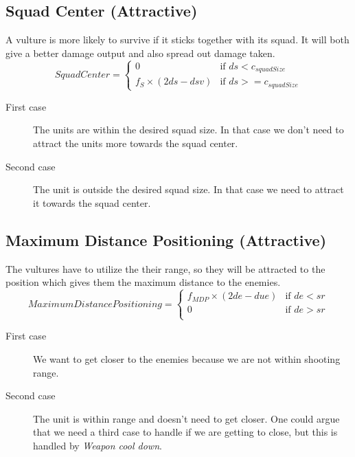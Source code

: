 	\subsection{Squad Center (Attractive)}
		\label{SCA_label}A vulture is more likely to survive if it sticks together with its squad. 
		It will both give a better damage output and also spread out damage taken.
		\begin{displaymath}
			SquadCenter  = \begin{cases}
					0 & \text{if } ds < c_{squadSize} \\
					f_{S} \times (2ds - dsv) & \text{if } ds >= c_{squadSize}
				\end{cases}		
		\end{displaymath}
		
		\begin{description}
			\item[First case] The units are within the desired squad size. In that case we don't need to attract the units more towards the squad center.
			\item[Second case] The unit is outside the desired squad size. In that case we need to attract it towards the squad center.
		\end{description}
	\subsection{Maximum Distance Positioning (Attractive)}
		The vultures have to utilize the their range, so they will be attracted to the position which gives them the maximum distance to the enemies.
		\begin{displaymath}
			MaximumDistancePositioning = \begin{cases}
					f_{MDP} \times (2de - due) & \text{if } de < sr\\
					0 & \text{if } de > sr\\
				\end{cases}		
		\end{displaymath}
		\begin{description}
			\item[First case] We want to get closer to the enemies because we are not within shooting range.
			\item[Second case] The unit is within range and doesn't need to get closer. One could argue that we need a third case to handle if we are getting to close, but this is handled by \textit{Weapon cool down}.
		\end{description}
